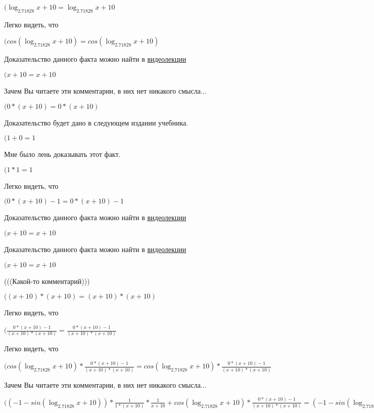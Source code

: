 \documentclass[12pt,a4paper,fleqn]{article}
\theoremstyle{definition}
\begin{document}
$(\log_{ 2.71828 }{ x  +  10 } = \log_{ 2.71828 }{ x  +  10 }$

Легко видеть, что

$(cos(\log_{ 2.71828 }{ x  +  10 }) = cos(\log_{ 2.71828 }{ x  +  10 })$

Доказательство данного факта можно найти в \href{https://www.youtube.com/watch?v=dQw4w9WgXcQ}{видеолекции}

$( x  +  10  =  x  +  10 $

Зачем Вы читаете эти комментарии, в них нет никакого смысла...

$( 0  * ( x  +  10 ) =  0  * ( x  +  10 )$

Доказательство будет дано в следующем издании учебника.

$( 1  +  0  =  1 $

Мне было лень доказывать этот факт.

$( 1  *  1  =  1 $

Легко видеть, что

$( 0  * ( x  +  10 ) -  1  =  0  * ( x  +  10 ) -  1 $

Доказательство данного факта можно найти в \href{https://www.youtube.com/watch?v=dQw4w9WgXcQ}{видеолекции}

$( x  +  10  =  x  +  10 $

Доказательство данного факта можно найти в \href{https://www.youtube.com/watch?v=dQw4w9WgXcQ}{видеолекции}

$( x  +  10  =  x  +  10 $

(((Какой-то комментарий)))

$(( x  +  10 ) * ( x  +  10 ) = ( x  +  10 ) * ( x  +  10 )$

Легко видеть, что

$(\frac{ 0  * ( x  +  10 ) -  1 }{( x  +  10 ) * ( x  +  10 )}
 = \frac{ 0  * ( x  +  10 ) -  1 }{( x  +  10 ) * ( x  +  10 )}
$

Легко видеть, что

$(cos(\log_{ 2.71828 }{ x  +  10 }) * \frac{ 0  * ( x  +  10 ) -  1 }{( x  +  10 ) * ( x  +  10 )}
 = cos(\log_{ 2.71828 }{ x  +  10 }) * \frac{ 0  * ( x  +  10 ) -  1 }{( x  +  10 ) * ( x  +  10 )}
$

Зачем Вы читаете эти комментарии, в них нет никакого смысла...

$(( -1  - sin(\log_{ 2.71828 }{ x  +  10 })) * \frac{ 1 }{ 1  * ( x  +  10 )}
 * \frac{ 1 }{ x  +  10 }
 + cos(\log_{ 2.71828 }{ x  +  10 }) * \frac{ 0  * ( x  +  10 ) -  1 }{( x  +  10 ) * ( x  +  10 )}
 = ( -1  - sin(\log_{ 2.71828 }{ x  +  10 })) * \frac{ 1 }{ 1  * ( x  +  10 )}
 * \frac{ 1 }{ x  +  10 }
 + cos(\log_{ 2.71828 }{ x  +  10 }) * \frac{ 0  * ( x  +  10 ) -  1 }{( x  +  10 ) * ( x  +  10 )}
$
\end{document}
